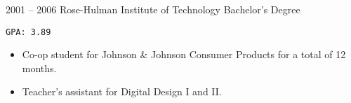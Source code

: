 \documentclass[10pt, letterpaper]{developercv}
\begin{document}

\begin{entrylist}
    \entry
        {2001 -- 2006}
        {Rose-Hulman Institute of Technology}
        {Bachelor's Degree}
        {%
            \texttt{GPA: 3.89}
            \begin{itemize}[nosep]
                \item Co-op student for Johnson \& Johnson Consumer Products
                    for a total of 12 months.
                \item Teacher's assistant for Digital Design I and II.
            \end{itemize}
        }
\end{entrylist}
\end{document}

